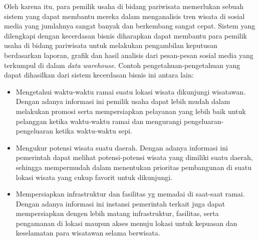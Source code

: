 Oleh karena itu, para pemilik usaha di bidang pariwisata memerlukan sebuah sistem yang dapat membantu mereka dalam menganalisis tren wisata di sosial media yang jumlahnya sangat banyak dan berkembang sangat cepat. Sistem yang dilengkapi dengan kecerdasan bisnis diharapkan dapat membantu para pemilik usaha di bidang pariwisata untuk melakukan pengambilan keputusan berdasarkan laporan, grafik dan hasil analisis dari pesan-pesan sosial media yang terkumpul di dalam \textit{data warehouse}. Contoh pengetahuan-pengetahuan yang dapat dihasilkan dari sistem kecerdasan bisnis ini antara lain:

\begin{itemize}
	\item Mengetahui waktu-waktu ramai suatu lokasi wisata dikunjungi wisatawan. Dengan adanya informasi ini pemilik usaha dapat lebih mudah dalam melakukan promosi serta mempersiapkan pelayanan yang lebih baik untuk pelanggan ketika waktu-waktu ramai dan mengurangi pengeluaran-pengeluaran ketika waktu-waktu sepi. 
	\item Mengukur potensi wisata suatu daerah. Dengan adanya informasi ini pemerintah dapat melihat potensi-potensi wisata yang dimiliki suatu daerah, sehingga mempermudah dalam menentukan prioritas pembangunan di suatu lokasi wisata yang cukup favorit untuk dikunjungi.
	\item Mempersiapkan infrastruktur dan fasilitas yg memadai di saat-saat ramai. Dengan adanya informasi ini instansi pemerintah terkait juga dapat mempersiapkan dengen lebih matang infrastruktur, fasilitas, serta pengamanan di lokasi maupun akses menuju lokasi untuk kepuasan dan keselamatan para wisatawan selama berwisata. 
\end{itemize}
